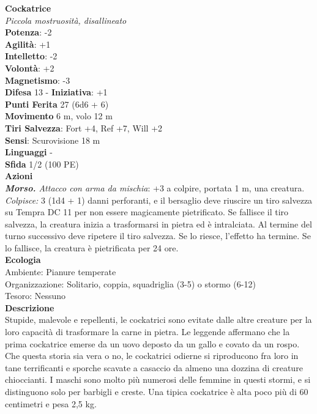 \begin{multicols}{2}
\medskip\textbf{Cockatrice}\\
\emph{Piccola mostruosità, disallineato}\\
\textbf{Potenza}: -2\\
\textbf{Agilità}: +1\\
\textbf{Intelletto}: -2\\
\textbf{Volontà}: +2\\
\textbf{Magnetismo}: -3\\
\textbf{Difesa} 13 - \textbf{Iniziativa}: +1\\
\textbf{Punti Ferita} 27 (6d6 + 6)\\
\textbf{Movimento} 6 m, volo 12 m\\
\textbf{Tiri Salvezza}: Fort +4, Ref +7, Will +2\\
\textbf{Sensi}: Scurovisione 18 m\\
\textbf{Linguaggi} -\\
\textbf{Sfida} 1/2 (100 PE)\smallskip\\
\smallskip\textbf{Azioni}\\
\emph{\textbf{Morso.} Attacco con arma da mischia}: +3 a colpire, portata 1 m, una creatura.\\
\emph{Colpisce:} 3 (1d4 + 1) danni perforanti, e il bersaglio deve riuscire un tiro salvezza su Tempra DC 11 per non essere magicamente pietrificato. Se fallisce il tiro salvezza, la creatura inizia a trasformarsi in pietra ed è intralciata. Al termine del turno successivo deve ripetere il tiro salvezza. Se lo riesce, l'effetto ha termine. Se lo fallisce, la creatura è pietrificata per 24 ore.\\
\textbf{Ecologia}\\
Ambiente: Pianure temperate\\
Organizzazione: Solitario, coppia, squadriglia (3-5) o stormo (6-12)\\
Tesoro: Nessuno\\
\textbf{Descrizione}\\
Stupide, malevole e repellenti, le cockatrici sono evitate dalle altre creature per la loro capacità di trasformare la carne in pietra. Le leggende affermano che la prima cockatrice emerse da un uovo deposto da un gallo e covato da un rospo. Che questa storia sia vera o no, le cockatrici odierne si riproducono fra loro in tane terrificanti e sporche scavate a casaccio da almeno una dozzina di creature chioccianti. I maschi sono molto più numerosi delle femmine in questi stormi, e si distinguono solo per barbigli e creste. Una tipica cockatrice è alta poco più di 60 centimetri e pesa 2,5 kg.\\

\end{multicols}
